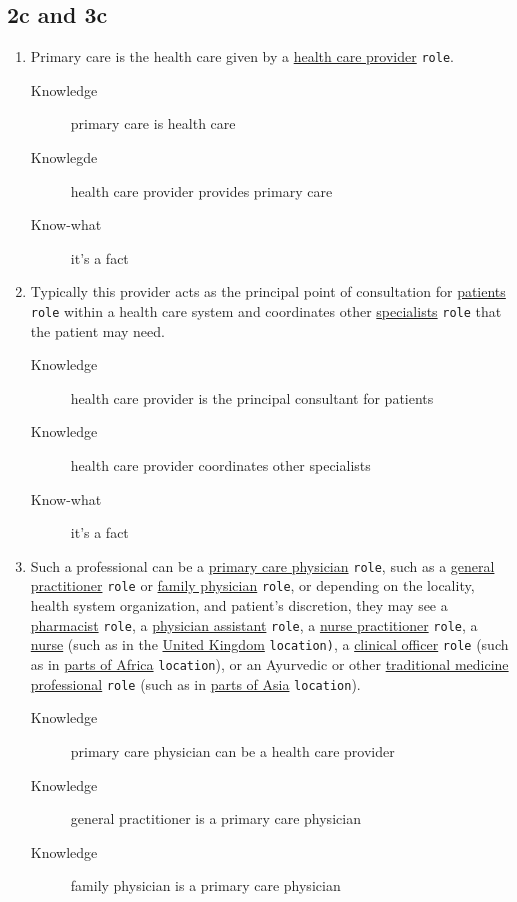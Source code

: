\documentclass[a4paper,10pt,twoside,twocolumn]{article}
\begin{document}
\subsection{2c and 3c}
\label{sec:orgbc51fda}

\begin{enumerate}
\item Primary care is the health care given by a \uline{health care provider} \texttt{role}.
\begin{description}
\item[{Knowledge}] primary care is health care
\item[{Knowlegde}] health care provider provides primary care
\item[{Know-what}] it's a fact
\end{description}
\item Typically this provider acts as the principal point of consultation for \uline{patients} \texttt{role} within a health care system and coordinates other \uline{specialists} \texttt{role} that the patient may need.
\begin{description}
\item[{Knowledge}] health care provider is the principal consultant for patients
\item[{Knowledge}] health care provider coordinates other specialists
\item[{Know-what}] it's a fact
\end{description}
\item Such a professional can be a \uline{primary care physician} \texttt{role}, such as a \uline{general practitioner} \texttt{role} or \uline{family physician} \texttt{role}, or depending on the locality, health system organization, and patient's discretion, they may see a \uline{pharmacist} \texttt{role}, a \uline{physician assistant} \texttt{role}, a \uline{nurse practitioner} \texttt{role}, a \uline{nurse} (such as in the \uline{United Kingdom} \texttt{location)}, a \uline{clinical officer} \texttt{role} (such as in \uline{parts of Africa} \texttt{location}), or an Ayurvedic or other \uline{traditional medicine professional} \texttt{role} (such as in \uline{parts of Asia} \texttt{location}).
\begin{description}
\item[{Knowledge}] primary care physician can be a health care provider
\item[{Knowledge}] general practitioner is a primary care physician
\item[{Knowledge}] family physician is a primary care physician

\end{description}
\end{enumerate}
\end{document}

